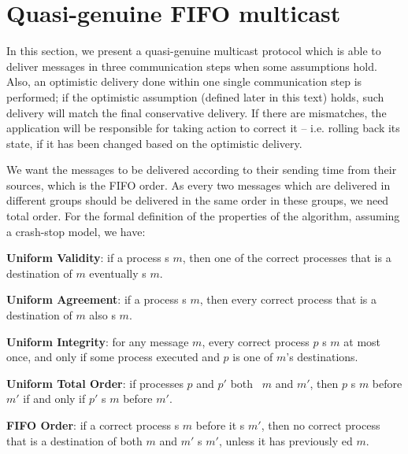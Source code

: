 \documentclass[times, 10pt]{article}
\begin{document}

\section{Quasi-genuine FIFO multicast}

In this section, we present a quasi-genuine multicast protocol which is able to deliver messages in three communication steps when some assumptions hold. Also, an optimistic delivery done within one single communication step is performed; if the optimistic assumption (defined later in this text) holds, such delivery will match the final conservative delivery. If there are mismatches, the application will be responsible for taking action to correct it -- i.e. rolling back its state, if it has been changed based on the optimistic delivery.

We want the messages to be delivered according to their sending time from their sources, which is the FIFO order. As every two messages which are delivered in different groups should be delivered in the same order in these groups, we need total order. For the formal definition of the properties of the algorithm, assuming a crash-stop model, we have:

\textbf{Uniform Validity}: if a process \cms{}s $m$, then one of the correct processes that is a destination of $m$ eventually \cons{}s $m$.

\textbf{Uniform Agreement}: if a process \cons{}s $m$, then every correct process that is a destination of $m$ also \cons{}s $m$.

\textbf{Uniform Integrity}: for any message $m$, every correct process $p$ \cons{}s $m$ at most once, and only if some process executed  and $p$ is one of $m$'s destinations.

\textbf{Uniform Total Order}: if processes $p$ and $p'$ both \cons\ $m$ and $m'$, then $p$ \cons{}s $m$ before $m'$ if and only if $p'$ \cons{}s $m$ before $m'$.

\textbf{FIFO Order}: if a correct process \cms{}s $m$ before it \cms{}s $m'$, then no correct process that is a destination of both $m$ and $m'$ \cons{}s $m'$, unless it has previously \cons{}ed  $m$.
 
\end{document}
